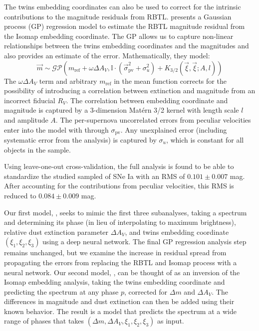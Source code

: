 The twins embedding coordinates can also be used to correct for the intrinsic contributions to the magnitude residuals from RBTL.  presents a Gaussian process (GP) regression model to estimate the RBTL magnitude residual from the Isomap embedding coordinate. The GP allows us to capture non-linear relationships between the twins embedding coordinates and the magnitudes and also provides an estimate of the error. Mathematically, they model:
\begin{equation}
    \vec{m} \sim \mathcal{GP}\left(m_{\text{ref}} + \omega\Delta A_V, \mathbb{I}\cdot(\vec{\sigma}_{\text{pv}}^2 + \sigma_u^2) + K_{3/2}(\vec{\xi}, \vec{\xi}; A, l)\right)
\end{equation}
The $\omega\Delta A_V$ term and arbitrary $m_{\text{ref}}$ in the mean function corrects for the possibility of introducing a correlation between extinction and magnitude from an incorrect fiducial $R_V$. The correlation between embedding coordinate and magnitude is captured by a 3-dimension Mat\'{e}rn 3/2 kernel with length scale $l$ and amplitude $A$. The per-supernova uncorrelated errors from peculiar velocities enter into the model with through $\sigma_{\text{pv}}$. Any unexplained error (including systematic error from the analysis) is captured by $\sigma_u$, which is constant for all objects in the sample.

Using leave-one-out cross-validation, the full analysis is found to be able to standardize the studied sampled of SNe Ia with an RMS of $0.101 \pm 0.007$ mag. After accounting for the contributions from peculiar velocities, this RMS is reduced to $0.084 \pm 0.009$ mag.

Our first model, \stoe, seeks to mimic the first three subanalyses, taking a spectrum and determining its phase (in lieu of interpolating to maximum brightness), relative dust extinction parameter $\Delta A_V$, and twins embedding coordinate $(\xi_1, \xi_2, \xi_3)$ using a deep neural network. The final GP regression analysis step remains unchanged, but we examine the increase in residual spread from propagating the errors from replacing the RBTL and Isomap process with a neural network. Our second model, \etos, can be thought of as an inversion of the Isomap embedding analysis, taking the twins embedding coordinate and predicting the spectrum at any phase $p$, corrected for $\Delta m$ and $\Delta A_V$. The differences in magnitude and dust extinction can then be added using their known behavior. The result is a model that predicts the spectrum at a wide range of phases that takes $(\Delta m, \Delta A_V, \xi_1, \xi_2, \xi_3)$ as input.

